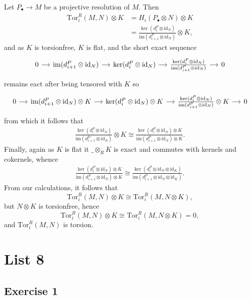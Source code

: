 \documentclass{article}
\theoremstyle{definition}
\newcommand{\im}{\text{im}}
\newcommand{\id}{\text{id}}
\newcommand{\Tor}{\text{Tor}}
\begin{document}
Let $P_{\bullet} \to M$ be a projective resolution of $M$. Then
\begin{align*}
	\Tor_{i}^{R}(M, N) \otimes K
	&=
	H_{i}(P_{\bullet} \otimes N) \otimes K \\
	&= 
	\frac{\ker(d^{P}_i \otimes \id_N)}{\im(d^{P}_{i + 1} \otimes \id_N)} \otimes K,
\end{align*} 
and as $K$ is torsionfree, $K$ is flat, and the short exact sequence 
\[
	\begin{tikzcd}[column sep = small]
	0
	\ar{r}
	& \im(d^{P}_{i+1} \otimes \id_N)
	\ar{r}
	& \ker(d^{P}_{i} \otimes \id_N)
	\ar{r}
	& \frac{\ker(d^{P}_i \otimes \id_N)}{\im(d^{P}_{i + 1} \otimes \id_N)}
	\ar{r}
	& 0
	\end{tikzcd}
\] 
remains eact after being tensored with $K$ so
\[
	\begin{tikzcd}[column sep = small]
	0
	\ar{r}
	& \im(d^{P}_{i+1} \otimes \id_N) \otimes K
	\ar{r}
	& \ker(d^{P}_{i} \otimes \id_N) \otimes K
	\ar{r}
	& \frac{\ker(d^{P}_i \otimes \id_N)}{\im(d^{P}_{i + 1} \otimes \id_N)} \otimes K
	\ar{r}
	& 0
	\end{tikzcd}
\]
from which it follows that
\begin{align*}
	\frac{\ker(d^{P}_i \otimes \id_N)}{\im(d^{P}_{i + 1} \otimes \id_N)} \otimes K
	\cong
	\frac{\ker(d^{P}_i \otimes \id_N) \otimes K}{\im(d^{P}_{i + 1} \otimes \id_N) \otimes K}.
\end{align*}
Finally, again as $K$ is flat it $\_ \otimes_R K$ is exact and commutes with kernels and cokernels,
whence 
\begin{align*}
	\frac{\ker(d^{P}_i \otimes \id_N) \otimes K}{\im(d^{P}_{i + 1} \otimes \id_N) \otimes K}
	\cong
	\frac{\ker(d^{P}_i \otimes \id_N \otimes \id_K)}{\im(d^{P}_{i + 1} \otimes \id_N \otimes \id_K)}.
\end{align*}
From our calculations, it follows that 
\[
	\Tor_{i}^{R}(M, N) \otimes K
	\cong
	\Tor_{i}^{R}(M, N \otimes K),
\] 
but $N \otimes K$ is torsionfree, hence 
\[
	\Tor_{i}^{R}(M, N) \otimes K
	\cong
	\Tor_{i}^{R}(M, N \otimes K)
	=
	0,
\] 
and $\Tor_{i}^{R}(M, N)$ is torsion. 


\section*{List 8}
\subsection*{Exercise 1}
\end{document}
